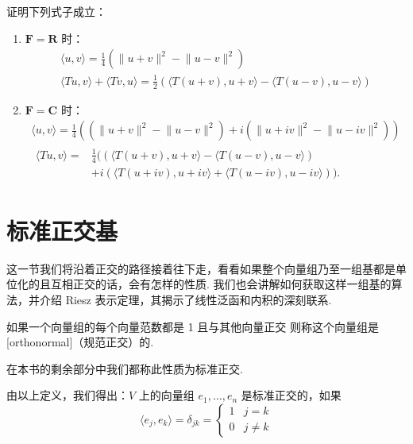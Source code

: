 \begin{example}
    证明下列式子成立：
    \begin{enumerate}
        \item $\mathbf{F} = \mathbf{R}$ 时：
        \begin{gather}
            \langle u, v\rangle  = \frac{1}{4}\left( \lVert u + v \rVert^2 - \lVert u - v \rVert^2\right) \\
            \langle Tu, v\rangle + \langle Tv, u\rangle = \frac{1}{2}\left(\langle T(u + v), u + v\rangle - \langle T(u - v), u - v\rangle\right)
        \end{gather}

        \item $\mathbf{F} = \mathbf{C}$ 时：
        \begin{gather}
            \langle u, v\rangle  = \frac{1}{4}\left( (\lVert u + v \rVert^2 - \lVert u - v \rVert^2) + i(\lVert u + iv \rVert^2 - \lVert u - iv \rVert^2) \right) \\
            \begin{aligned}
                \langle Tu, v\rangle = & \frac{1}{4}  ((\langle T(u + v), u + v\rangle - \langle T(u - v), u - v\rangle) \\
                                                    & + i(\langle T(u + iv), u + iv\rangle + \langle T(u - iv), u - iv\rangle)).
            \end{aligned}
        \end{gather}
    \end{enumerate}

\end{example}


\section{标准正交基}

这一节我们将沿着正交的路径接着往下走，看看如果整个向量组乃至一组基都是单位化的且互相正交的话，会有怎样的性质.
我们也会讲解如何获取这样一组基的算法，并介绍 Riesz 表示定理，其揭示了线性泛函和内积的深刻联系.

\begin{definition}
    如果一个向量组的每个向量范数都是 1 且与其他向量正交
    则称这个向量组是[orthonormal]（规范正交）的.
\end{definition}

在本书的剩余部分中我们都称此性质为标准正交.

由以上定义，我们得出：$ V $ 上的向量组 $ e_1, \ldots , e_n $ 是标准正交的，如果
\[ \langle e_j, e_k \rangle = \delta _{jk} =
\begin{cases}
    1 & j = k \\
    0 & j \neq k
\end{cases}\]

